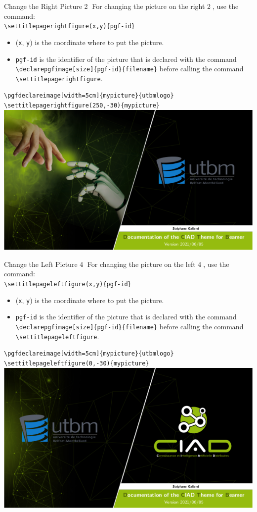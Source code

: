 \documentclass[english,sectioncirclenumberstyle]{ciadbeamer}
\begin{document}
\begin{frame}[t]{Change the Right Picture \textcircled{2}}
	For changing the picture on the right \textcircled{2}, use the command: \\[.25cm]
	\texttt{{\textbackslash}settitlepagerightfigure(x,y)\{pgf-id\}} \\[.25cm]
	\begin{itemize}
		\item (\texttt{x}, \texttt{y}) is the coordinate where to put the picture.
		\item \texttt{pgf-id} is the identifier of the picture that is declared with the command \texttt{{\textbackslash}declarepgfimage[size]\{pgf-id\}\{filename\}} before calling the command \texttt{{\textbackslash}settitlepagerightfigure}.
	\end{itemize}
	\begin{example}
		\texttt{{\textbackslash}pgfdeclareimage[width=5cm]\{mypicture\}\{utbmlogo\}} \\
		\texttt{{\textbackslash}settitlepagerightfigure(250,-30)\{mypicture\}} \\
		\centering\includegraphics[width=.25\linewidth]{frontpage2}
	\end{example}
\end{frame}

\begin{frame}[t]{Change the Left Picture \textcircled{4}}
	For changing the picture on the left \textcircled{4}, use the command: \\[.25cm]
	\texttt{{\textbackslash}settitlepageleftfigure(x,y)\{pgf-id\}} \\[.25cm]
	\begin{itemize}
		\item (\texttt{x}, \texttt{y}) is the coordinate where to put the picture.
		\item \texttt{pgf-id} is the identifier of the picture that is declared with the command \texttt{{\textbackslash}declarepgfimage[size]\{pgf-id\}\{filename\}} before calling the command \texttt{{\textbackslash}settitlepageleftfigure}.
	\end{itemize}
	\begin{example}
		\texttt{{\textbackslash}pgfdeclareimage[width=5cm]\{mypicture\}\{utbmlogo\}} \\
		\texttt{{\textbackslash}settitlepageleftfigure(0,-30)\{mypicture\}} \\
		\centering\includegraphics[width=.25\linewidth]{frontpage4}
	\end{example}
\end{frame}
\end{document}
